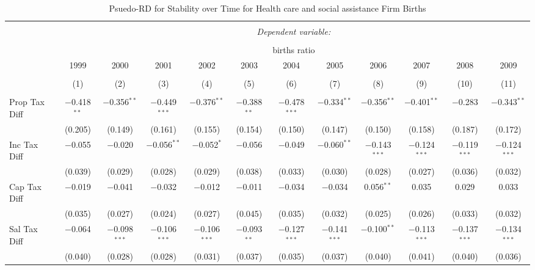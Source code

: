 
\begin{table}[!htbp] \centering 
  \caption{Psuedo-RD for Stability over Time for  Health care and social assistance Firm Births} 
  \label{62year} 
\small 
\begin{tabular}{@{\extracolsep{5pt}}lccccccccccc} 
\\[-1.8ex]\hline 
\hline \\[-1.8ex] 
 & \multicolumn{11}{c}{\textit{Dependent variable:}} \\ 
\cline{2-12} 
\\[-1.8ex] & \multicolumn{11}{c}{births ratio} \\ 
 & 1999 & 2000 & 2001 & 2002 & 2003 & 2004 & 2005 & 2006 & 2007 & 2008 & 2009 \\ 
\\[-1.8ex] & (1) & (2) & (3) & (4) & (5) & (6) & (7) & (8) & (9) & (10) & (11)\\ 
\hline \\[-1.8ex] 
 Prop Tax Diff & $-$0.418$^{**}$ & $-$0.356$^{**}$ & $-$0.449$^{***}$ & $-$0.376$^{**}$ & $-$0.388$^{**}$ & $-$0.478$^{***}$ & $-$0.334$^{**}$ & $-$0.356$^{**}$ & $-$0.401$^{**}$ & $-$0.283 & $-$0.343$^{**}$ \\ 
  & (0.205) & (0.149) & (0.161) & (0.155) & (0.154) & (0.150) & (0.147) & (0.150) & (0.158) & (0.187) & (0.172) \\ 
  Inc Tax Diff & $-$0.055 & $-$0.020 & $-$0.056$^{**}$ & $-$0.052$^{*}$ & $-$0.056 & $-$0.049 & $-$0.060$^{**}$ & $-$0.143$^{***}$ & $-$0.124$^{***}$ & $-$0.119$^{***}$ & $-$0.124$^{***}$ \\ 
  & (0.039) & (0.029) & (0.028) & (0.029) & (0.038) & (0.033) & (0.030) & (0.028) & (0.027) & (0.036) & (0.032) \\ 
  Cap Tax Diff & $-$0.019 & $-$0.041 & $-$0.032 & $-$0.012 & $-$0.011 & $-$0.034 & $-$0.034 & 0.056$^{**}$ & 0.035 & 0.029 & 0.033 \\ 
  & (0.035) & (0.027) & (0.024) & (0.027) & (0.045) & (0.035) & (0.032) & (0.025) & (0.026) & (0.033) & (0.032) \\ 
  Sal Tax Diff & $-$0.064 & $-$0.098$^{***}$ & $-$0.106$^{***}$ & $-$0.106$^{***}$ & $-$0.093$^{**}$ & $-$0.127$^{***}$ & $-$0.141$^{***}$ & $-$0.100$^{**}$ & $-$0.113$^{***}$ & $-$0.137$^{***}$ & $-$0.134$^{***}$ \\ 
  & (0.040) & (0.028) & (0.028) & (0.031) & (0.037) & (0.035) & (0.037) & (0.040) & (0.041) & (0.040) & (0.036) \\ 

\end{tabular}
\end{table}
